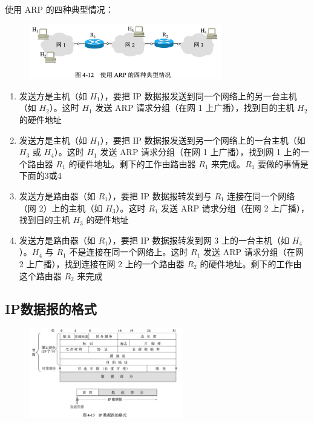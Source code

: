 \documentclass[cs4size,a4paper,10pt]{ctexart}
\begin{document}
	使用 ARP 的四种典型情况：
	\begin{figure}[H]
		\centering
		\includegraphics[width=0.75\textwidth]{img/4.12}
	\end{figure}
	\begin{enumerate}[label=\arabic*.]
		\item 发送方是主机（如 $H_1$），要把 IP 数据报发送到同一个网络上的另一台主机（如 $H_2$）。这时 $H_1$ 发送 ARP 请求分组（在网 1 上广播），找到目的主机 $H_2$ 的硬件地址
		\item 发送方是主机（如 $H_1$），要把 IP 数据报发送到另一个网络上的一台主机（如 $H_3$ 或 $H_4$）。这时 $H_1$ 发送 ARP 请求分组（在网 1 上广播），找到网 1 上的一个路由器 $R_1$ 的硬件地址。剩下的工作由路由器 $R_1$ 来完成。$R_1$ 要做的事情是下面的3或4
		\item 发送方是路由器（如 $R_1$），要把 IP 数据报转发到与 $R_1$ 连接在同一个网络（网 2）上的主机（如 $H_3$）。这时 $R_1$ 发送 ARP 请求分组（在网 2 上广播），找到目的主机 $H_3$ 的硬件地址
		\item 发送方是路由器（如 $R_1$），要把 IP 数据报转发到网 3 上的一台主机（如 $H_4$）。$H_4$ 与 $R_1$ 不是连接在同一个网络上。这时 $R_1$ 发送 ARP 请求分组（在网 2 上广播），找到连接在网 2 上的一个路由器 $R_2$ 的硬件地址。剩下的工作由这个路由器 $R_2$ 来完成
	\end{enumerate}

	\subsection{IP数据报的格式}
	\begin{figure}[H]
		\centering
		\includegraphics[width=0.6\textwidth]{img/4.13}
	\end{figure}
\end{document}
